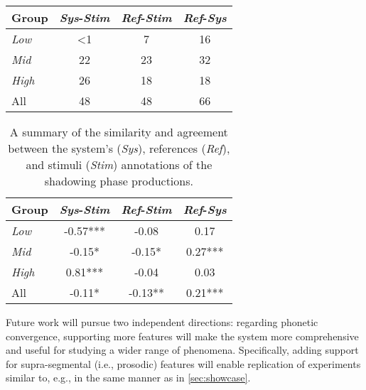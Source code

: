 \begin{table}[t]
	\centering
		\begin{tabularx}{\linewidth}{X*{3}{S[table-format=2.0]}}
			\toprule
			Group & {\emph{Sys}-\emph{Stim}} & {\emph{Ref}-\emph{Stim}} & {\emph{Ref}-\emph{Sys}} \\
			\midrule
			\emph{Low}  & {<1} &  7 & 16 \\
			\emph{Mid}  &  22  & 23 & 32 \\
			\emph{High} &  26  & 18 & 18 \\
			All   		&  48  & 48 & 66 \\
			\bottomrule
		\end{tabularx}
		\label{tab:validation_shadow_similarity}
\end{table}
\begin{table}
		\begin{tabularx}{\linewidth}{X*{3}{S[table-format=2.2]}@{\quad}}
			\toprule
			Group & {\emph{Sys}-\emph{Stim}} & {\emph{Ref}-\emph{Stim}} & {\emph{Ref}-\emph{Sys}} \\
			\midrule
			\emph{Low}  & -0.57*** & -0.08   & 0.17    \\
			\emph{Mid}  & -0.15*   & -0.15*  & 0.27*** \\
			\emph{High} &  0.81*** & -0.04   & 0.03    \\
			All   		& -0.11*   & -0.13** & 0.21*** \\
			\bottomrule
		\end{tabularx}
		\label{tab:validation_shadow_kappa}
	\caption[Similarity and agreement evaluation of system and stimulus sets]{A summary of the similarity and agreement between the system's (\emph{Sys}), references (\emph{Ref}), and stimuli (\emph{Stim}) annotations of the shadowing phase productions.}
	\label{tab:validation_shadow}
\end{table}

Future work will pursue two independent directions:
regarding phonetic convergence, supporting more features will make the system more comprehensive and useful for studying a wider range of phenomena.
Specifically, adding support for supra-segmental (i.e., prosodic) features will enable replication of experiments similar to, e.g., \citet{Levitan2014acoustic, Levitan2016implementing} in the same manner as in \cref{sec:showcase}.

